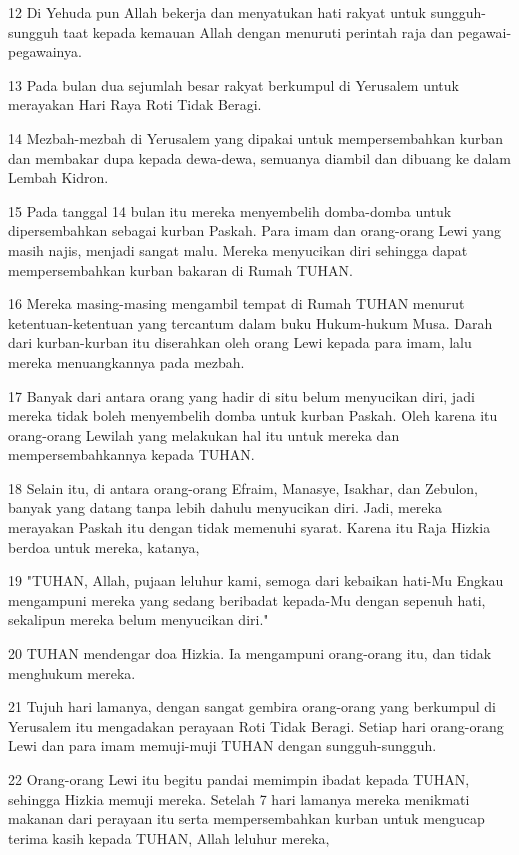 \par 12 Di Yehuda pun Allah bekerja dan menyatukan hati rakyat untuk sungguh-sungguh taat kepada kemauan Allah dengan menuruti perintah raja dan pegawai-pegawainya.
\par 13 Pada bulan dua sejumlah besar rakyat berkumpul di Yerusalem untuk merayakan Hari Raya Roti Tidak Beragi.
\par 14 Mezbah-mezbah di Yerusalem yang dipakai untuk mempersembahkan kurban dan membakar dupa kepada dewa-dewa, semuanya diambil dan dibuang ke dalam Lembah Kidron.
\par 15 Pada tanggal 14 bulan itu mereka menyembelih domba-domba untuk dipersembahkan sebagai kurban Paskah. Para imam dan orang-orang Lewi yang masih najis, menjadi sangat malu. Mereka menyucikan diri sehingga dapat mempersembahkan kurban bakaran di Rumah TUHAN.
\par 16 Mereka masing-masing mengambil tempat di Rumah TUHAN menurut ketentuan-ketentuan yang tercantum dalam buku Hukum-hukum Musa. Darah dari kurban-kurban itu diserahkan oleh orang Lewi kepada para imam, lalu mereka menuangkannya pada mezbah.
\par 17 Banyak dari antara orang yang hadir di situ belum menyucikan diri, jadi mereka tidak boleh menyembelih domba untuk kurban Paskah. Oleh karena itu orang-orang Lewilah yang melakukan hal itu untuk mereka dan mempersembahkannya kepada TUHAN.
\par 18 Selain itu, di antara orang-orang Efraim, Manasye, Isakhar, dan Zebulon, banyak yang datang tanpa lebih dahulu menyucikan diri. Jadi, mereka merayakan Paskah itu dengan tidak memenuhi syarat. Karena itu Raja Hizkia berdoa untuk mereka, katanya,
\par 19 "TUHAN, Allah, pujaan leluhur kami, semoga dari kebaikan hati-Mu Engkau mengampuni mereka yang sedang beribadat kepada-Mu dengan sepenuh hati, sekalipun mereka belum menyucikan diri."
\par 20 TUHAN mendengar doa Hizkia. Ia mengampuni orang-orang itu, dan tidak menghukum mereka.
\par 21 Tujuh hari lamanya, dengan sangat gembira orang-orang yang berkumpul di Yerusalem itu mengadakan perayaan Roti Tidak Beragi. Setiap hari orang-orang Lewi dan para imam memuji-muji TUHAN dengan sungguh-sungguh.
\par 22 Orang-orang Lewi itu begitu pandai memimpin ibadat kepada TUHAN, sehingga Hizkia memuji mereka. Setelah 7 hari lamanya mereka menikmati makanan dari perayaan itu serta mempersembahkan kurban untuk mengucap terima kasih kepada TUHAN, Allah leluhur mereka,

